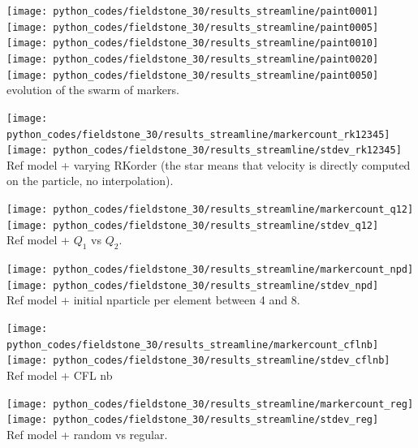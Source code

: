 \begin{center}
\texttt{[image: python\_codes/fieldstone\_30/results\_streamline/paint0001]}
\texttt{[image: python\_codes/fieldstone\_30/results\_streamline/paint0005]}
\texttt{[image: python\_codes/fieldstone\_30/results\_streamline/paint0010]}
\texttt{[image: python\_codes/fieldstone\_30/results\_streamline/paint0020]}
\texttt{[image: python\_codes/fieldstone\_30/results\_streamline/paint0050]}\\
{\captionfont evolution of the swarm of markers.}
\end{center} 


\begin{center}
\texttt{[image: python\_codes/fieldstone\_30/results\_streamline/markercount\_rk12345]}
\texttt{[image: python\_codes/fieldstone\_30/results\_streamline/stdev\_rk12345]}\\
{\captionfont Ref model + varying RKorder (the star means that velocity 
is directly computed on the particle, no interpolation).}
\end{center} 

\begin{center}
\texttt{[image: python\_codes/fieldstone\_30/results\_streamline/markercount\_q12]}
\texttt{[image: python\_codes/fieldstone\_30/results\_streamline/stdev\_q12]}\\
{\captionfont Ref model + $Q_1$ vs $Q_2$. }
\end{center}

\begin{center}
\texttt{[image: python\_codes/fieldstone\_30/results\_streamline/markercount\_npd]}
\texttt{[image: python\_codes/fieldstone\_30/results\_streamline/stdev\_npd]}\\
{\captionfont Ref model + initial nparticle per element between 4 and 8.}
\end{center}

\begin{center}
\texttt{[image: python\_codes/fieldstone\_30/results\_streamline/markercount\_cflnb]}
\texttt{[image: python\_codes/fieldstone\_30/results\_streamline/stdev\_cflnb]}\\
{\captionfont Ref model + CFL nb}
\end{center}

\begin{center}
\texttt{[image: python\_codes/fieldstone\_30/results\_streamline/markercount\_reg]}
\texttt{[image: python\_codes/fieldstone\_30/results\_streamline/stdev\_reg]}\\
{\captionfont Ref model + random vs regular.} 
\end{center}

